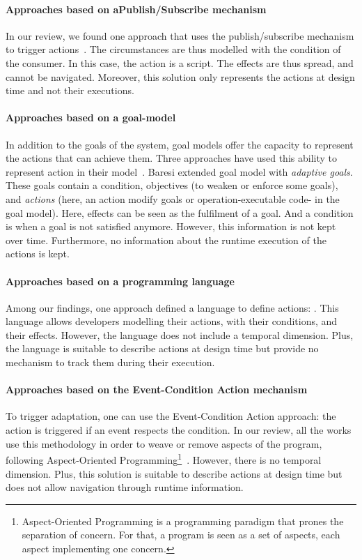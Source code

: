 \paragraph{Approaches based on aPublish/Subscribe mechanism}
In our review, we found one approach that uses the publish/subscribe mechanism to trigger \linebreak \glspl{action}~\cite{DBLP:conf/icse/BarbosaLMJ17}.
The \glspl{circumstance} are thus modelled with the condition of the consumer.
In this case, the \gls{action} is a script.
The effects are thus spread, and cannot be navigated.
Moreover, this solution only represents the actions at design time and not their executions.
	
\paragraph{Approaches based on a goal-model}
In addition to the goals of the system, goal models offer the capacity to represent the \glspl{action} that can achieve them.
Three approaches have used this ability to represent action in their model~\cite{DBLP:conf/icse/MendoncaAR14, DBLP:conf/iceccs/BencomoWSW12, DBLP:conf/re/BaresiPS10}.
Baresi \etal extended goal model with \textit{adaptive goals}.
These goals contain a condition, objectives (to weaken or enforce some goals), and \textit{actions} (here, an action modify goals or operation-executable code- in the goal model).
Here, effects can be seen as the fulfilment of a goal.
And a condition is when a goal is not satisfied anymore.
However, this information is not kept over time.
Furthermore, no information about the runtime execution of the actions is kept.
	
\paragraph{Approaches based on a programming language}
Among our findings, one approach defined a language to define actions: \cite{DBLP:journals/jss/ChengG12}.
This language allows developers modelling their actions, with their conditions, and their effects.
However, the language does not include a temporal dimension.
Plus, the language is suitable to describe actions at design time but provide no mechanism to track them during their execution.
	
\paragraph{Approaches based on the Event-Condition Action mechanism}
To trigger adaptation, one can use the Event-Condition Action approach: the action is triggered if an event respects the condition.
In our review, all the works use this methodology in order to weave or remove aspects of the program, following Aspect-Oriented Programming\footnote{Aspect-Oriented Programming is a programming paradigm that prones the separation of concern. For that, a program is seen as a set of aspects, each aspect implementing one concern.}~\cite{DBLP:conf/icws/CharfiDM09, DBLP:journals/scp/ParraBCD11, DBLP:conf/soco/DavidL06}.
However, there is no temporal dimension.
Plus, this solution is suitable to describe actions at design time but does not allow navigation through runtime information.

